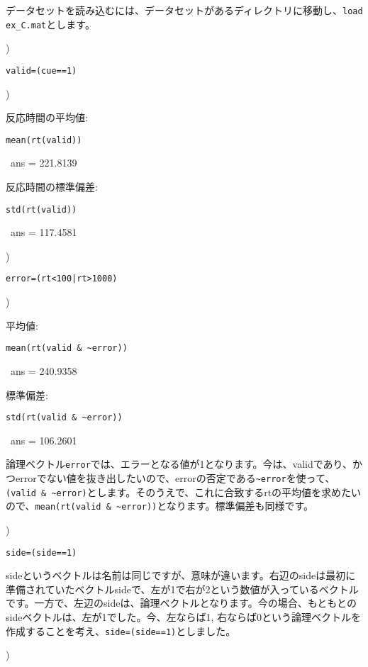 \documentclass{jsarticle}
\begin{document}
\bigskip

\begin{screen}
データセットを読み込むには、データセットがあるディレクトリに移動し、{\tt load ex\_C.mat}とします。
\end{screen}

)

{\tt valid=(cue==1)}

\bigskip

)

反応時間の平均値: {\tt mean(rt(valid)) 

\ ans = 221.8139}

反応時間の標準偏差: {\tt std(rt(valid)) 

\ ans = 117.4581}

\bigskip

)

{\tt error=(rt<100|rt>1000)}

\bigskip

)

平均値: {\tt mean(rt(valid \& \verb|~error|)) 

\ ans = 240.9358}

標準偏差: {\tt std(rt(valid \& \verb|~error|)) 

\ ans = 106.2601}

\begin{screen}
論理ベクトル{\tt error}では、エラーとなる値が1となります。今は、validであり、かつerrorでない値を抜き出したいので、errorの否定である{\tt \verb|~error|}を使って、{\tt (valid \& \verb|~error|)}とします。そのうえで、これに合致するrtの平均値を求めたいので、{\tt mean(rt(valid \& \verb|~error|))}となります。標準偏差も同様です。
\end{screen}

\bigskip

)

{\tt side=(side==1)}

\begin{screen}
sideというベクトルは名前は同じですが、意味が違います。右辺のsideは最初に準備されていたベクトルsideで、左が1で右が2という数値が入っているベクトルです。一方で、左辺のsideは、論理ベクトルとなります。今の場合、もともとのsideベクトルは、左が1でした。今、左ならば1, 右ならば0という論理ベクトルを作成することを考え、{\tt side=(side==1)}としました。
\end{screen}

\bigskip

)
\end{document}
